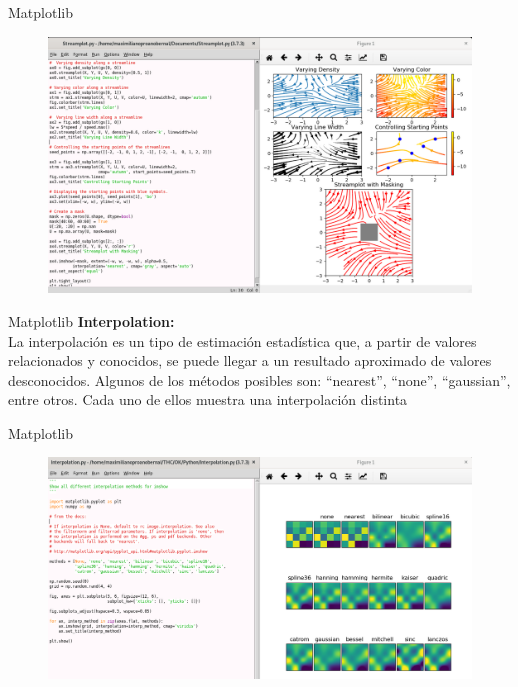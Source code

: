 \documentclass{beamer}
\begin{document}
\begin{frame}{Matplotlib}
	\begin{figure}
		\centering
		\includegraphics[width=1.0\linewidth]{"../Python/Captura Streamplot"}
		\caption{}
		\label{fig:captura-streamplot}
	\end{figure}
	
\end{frame}

\begin{frame}{Matplotlib}
	\textbf{Interpolation:}\\ La interpolación es un tipo de estimación estadística que, a partir de valores relacionados y conocidos, se puede llegar a un resultado aproximado de valores desconocidos. Algunos de los métodos posibles son: “nearest”, “none”, “gaussian”, entre otros. Cada uno de ellos muestra una interpolación distinta
\end{frame}

\begin{frame}{Matplotlib}
	\begin{figure}
		\centering
		\includegraphics[width=1.0\linewidth]{"../Python/Captura interpolation"}
		\caption{}
		\label{fig:captura-interpolation}
	\end{figure}
	
\end{frame}
\end{document}
